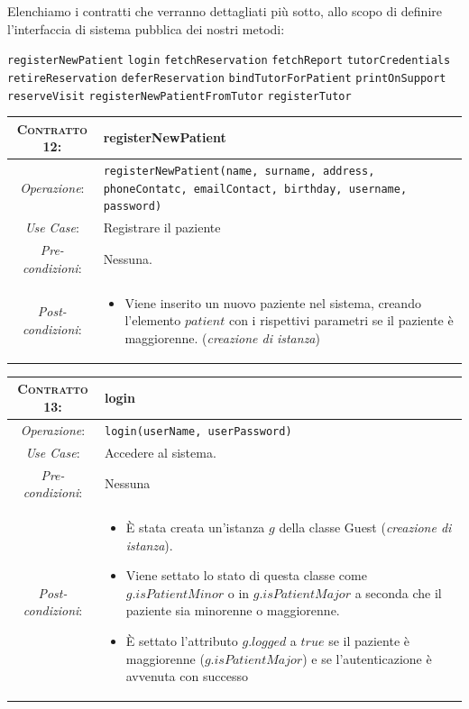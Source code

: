 Elenchiamo i contratti che verranno dettagliati più
sotto, allo scopo di definire l'interfaccia 
di sistema pubblica dei nostri metodi:
\begin{itemize}
\diam \texttt{registerNewPatient}
\diam \texttt{login}
\diam \texttt{fetchReservation}
\diam \texttt{fetchReport}
\diam \texttt{tutorCredentials}
\diam \texttt{retireReservation}
\diam \texttt{deferReservation}
\diam \texttt{bindTutorForPatient}
\diam \texttt{printOnSupport}
\diam \texttt{reserveVisit}
\diam \texttt{registerNewPatientFromTutor}
\diam \texttt{registerTutor}
\end{itemize}

\begin{tabularx}{\columnwidth}{cX}
\toprule
\textsc{Contratto 12}:& \textbf{registerNewPatient}\\
\midrule
\textit{Operazione}: & 	\texttt{registerNewPatient(name, surname, address, phoneContatc, emailContact, birthday, username, password)}\\
\textit{Use Case}: &	Registrare il paziente\\
\textit{Pre-condizioni}: &  Nessuna.\\
\textit{Post-condizioni}: & \begin{itemize}
\item Viene inserito un nuovo paziente nel sistema, creando l'elemento $patient$ con i 
rispettivi parametri se il paziente è maggiorenne. (\textit{creazione di istanza})
\end{itemize}\\
\bottomrule
\end{tabularx}
\medskip

\begin{tabularx}{\columnwidth}{cX}
\toprule
\textsc{Contratto 13}:& \textbf{login}\\
\midrule
\textit{Operazione}: & 	\texttt{login(userName, userPassword)}\\
\textit{Use Case}: &	Accedere al sistema.\\
\textit{Pre-condizioni}: &  Nessuna\\
\textit{Post-condizioni}: & \begin{itemize}
\item È stata creata un’istanza $g$ della classe Guest (\textit{creazione di istanza}). 
\item Viene settato lo stato di questa classe come $g.isPatientMinor$ o in 
	$g.isPatientMajor$ a seconda che il paziente sia minorenne o maggiorenne.
\item È settato l'attributo $g.logged$ a $true$ se il paziente è maggiorenne 
	($g.isPatientMajor$) e se l'autenticazione è avvenuta con successo
\end{itemize}\\
\bottomrule
\end{tabularx}
\medskip


